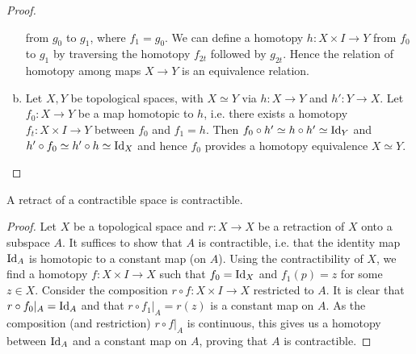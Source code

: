 \documentclass{../../mathnotes}
\begin{document}
\begin{proof}
\begin{enumerate}[(a)]
            from $g_0$ to $g_1$, where $f_1=g_0$. We can define a homotopy $h:X\times I\to Y$ from $f_0$ to $g_1$ by traversing
            the homotopy $f_{2t}$ followed by $g_{2t}$. Hence the relation of homotopy among maps $X\to Y$ is an
            equivalence relation.
        \item Let $X,Y$ be topological spaces, with $X\simeq Y$ via $h:X\to Y$ and $h':Y\to X$. Let $f_0:X\to Y$ be a map
            homotopic to $h$, i.e. there exists a homotopy $f_t:X\times I\to Y$ between $f_0$ and $f_1=h$. Then
            $f_0\circ h'\simeq h\circ h'\simeq \operatorname{Id}_Y$ and $h'\circ f_0\simeq h'\circ h\simeq\operatorname{Id}_X$ and hence $f_0$ provides
            a homotopy equivalence $X\simeq Y$.
    \end{enumerate}
\end{proof}

\begin{prop}
    A retract of a contractible space is contractible.
\end{prop}
\begin{proof}
    Let $X$ be a topological space and $r:X\to X$ be a retraction of $X$ onto a subspace $A$.
    It suffices to show that $A$ is contractible, i.e. that the identity map $\operatorname{Id}_A$ is homotopic to a
    constant map (on $A$). Using the contractibility of $X$, we find a homotopy $f:X\times I\to X$ such
    that $f_0=\operatorname{Id}_X$ and $f_1(p)=z$ for some $z\in X$. Consider the composition $r\circ f:X\times I\to X$
    restricted to $A$.
    It is clear that $r\circ f_0|_A=\operatorname{Id}_A$ and that $r\circ f_1|_A=r(z)$ is a constant map on $A$.
    As the composition (and restriction) $r\circ f|_A$ is continuous, this gives us a homotopy between
    $\operatorname{Id}_A$ and a constant map on $A$, proving that $A$ is contractible.
\end{proof}
\end{document}
